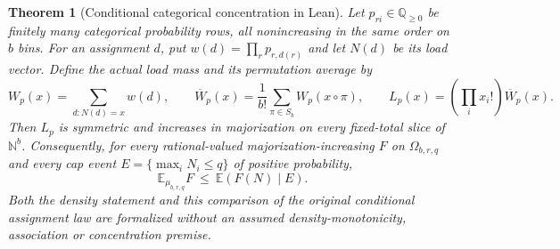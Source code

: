 \documentclass[11pt]{article}
\newtheorem{theorem}{Theorem}
\begin{document}
\begin{theorem}[Conditional categorical concentration in Lean]\label{thm:leandensity}
Let $p_{ri}\in\mathbb Q_{\geq0}$ be finitely many categorical probability
rows, all nonincreasing in the same order on $b$ bins. For an assignment
$d$, put $w(d)=\prod_r p_{r,d(r)}$ and let $N(d)$ be its load vector.
Define the actual load mass and its permutation average by
\[
 W_p(x)=\sum_{d:N(d)=x}w(d),\qquad
 \overline W_p(x)=\frac1{b!}\sum_{\pi\in S_b}W_p(x\circ\pi),
 \qquad L_p(x)=\left(\prod_i x_i!\right)\overline W_p(x).
\]
Then $L_p$ is symmetric and increases in majorization on every fixed-total
slice of $\mathbb N^b$. Consequently, for every rational-valued
majorization-increasing $F$ on $\Omega_{b,r,q}$ and every cap event
$E=\{\max_i N_i\leq q\}$ of positive probability,
\[
 \mathbb E_{\mu_{b,r,q}}F\ \leq\ \mathbb E(F(N)\mid E).
\]
Both the density statement and this comparison of the original conditional
assignment law are formalized without an assumed density-monotonicity,
association or concentration premise.
\end{theorem}
\end{document}
